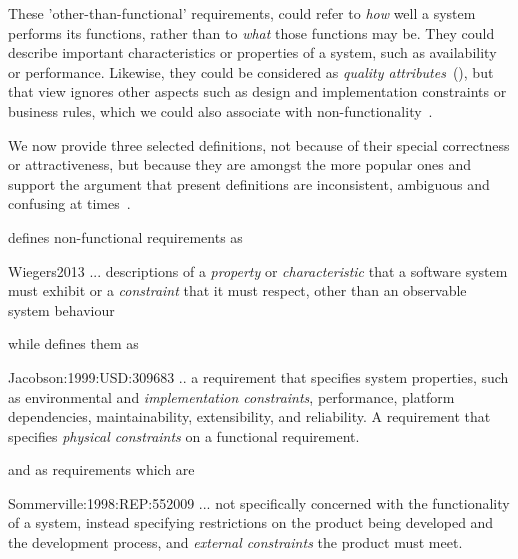 \documentclass[dissertation,final]{softeng}
\begin{document}
These 'other-than-functional' requirements, could refer to \emph{how} well a system performs its functions, rather than to \emph{what} those functions may be. They could describe important characteristics or properties of a system, such as availability or performance. Likewise, they could be considered as \emph{quality attributes}~(), but that view ignores other aspects such as design and implementation constraints or business rules, which we could also associate with non-functionality~\citep{Wiegers2013}.

We now provide three selected definitions, not because of their special correctness or attractiveness, but because they are amongst the more popular ones and support the argument that present definitions are inconsistent, ambiguous and confusing at times~\citep{Glinz:2007ehba}.

\citet{Wiegers2013} defines non-functional requirements as
\begin{displaycquote}{Wiegers2013}
... descriptions of a \emph{property} or \emph{characteristic} that a software system must exhibit or a \emph{constraint} that it must respect, other than an observable system behaviour
\end{displaycquote}

while \citet{Jacobson:1999:USD:309683} defines them as
\begin{displaycquote}{Jacobson:1999:USD:309683}
.. a requirement that specifies system properties, such as environmental and \emph{implementation constraints}, performance, platform dependencies, maintainability, extensibility, and reliability. A requirement that specifies \emph{physical constraints} on a functional requirement.
\end{displaycquote}

and \citet{Sommerville:1998:REP:552009} as requirements which are
\begin{displaycquote}{Sommerville:1998:REP:552009}
... not specifically concerned with the functionality of a system, instead specifying restrictions on the product being developed and the development process, and \emph{external constraints} the product must meet.
\end{displaycquote}
\end{document}
